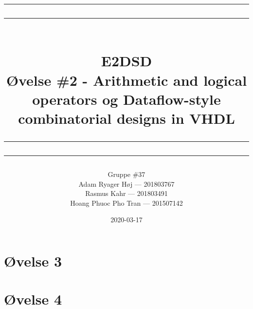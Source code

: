 \documentclass[12pt,a4paper]{article}
\newcommand\mymaketitle[1]{
   \rule{\textwidth}{1.6pt}\vspace*{-\baselineskip}\vspace*{2pt}
   \rule{\textwidth}{0.4pt}
   \\   
   \huge \bf #1\\
   \vspace{-8pt}
   \rule{\textwidth}{0.4pt}\vspace*{-\baselineskip}\vspace{3.2pt}
   \rule{\textwidth}{1.6pt}
}
\begin{document}
\title{
	\mymaketitle{E2DSD\\Øvelse \#2 - Arithmetic and logical operators og Dataflow-style combinatorial designs in VHDL}
}
\author{
	Gruppe \#37\\
	Adam Ryager Høj --- 201803767\\
   Rasmus Kahr --- 201803491\\
   Hoang Phuoc Pho Tran --- 201507142
}
\date{2020-03-17}

\maketitle
\newpage
\section{Øvelse 3}

\section{Øvelse 4}

\end{document}
